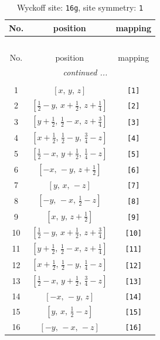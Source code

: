 \documentclass[fleqn,8pt]{jsarticle}
\begin{document}
\begin{longtable}{ccc}
\caption{Wyckoff site: {\tt 16g}, site symmetry: {\tt 1}}
 \\
 \hline \hline
No. & position & mapping \\ \hline \endfirsthead

\multicolumn{2}{l}{\tablename\ \thetable{}} \\
 \hline \hline
No. & position & mapping \\ \hline \endhead

 \hline \hline
\multicolumn{2}{r}{\footnotesize\it continued ...} \\ \endfoot

 \hline \hline
\multicolumn{2}{r}{} \\ \endlastfoot

1 & $\left[ x,\, y,\, z \right]$ & {\tt [1]} \\ \hline
2 & $\left[ \frac{1}{2} - y,\, x + \frac{1}{2},\, z + \frac{1}{4} \right]$ & {\tt [2]} \\ \hline
3 & $\left[ y + \frac{1}{2},\, \frac{1}{2} - x,\, z + \frac{3}{4} \right]$ & {\tt [3]} \\ \hline
4 & $\left[ x + \frac{1}{2},\, \frac{1}{2} - y,\, \frac{3}{4} - z \right]$ & {\tt [4]} \\ \hline
5 & $\left[ \frac{1}{2} - x,\, y + \frac{1}{2},\, \frac{1}{4} - z \right]$ & {\tt [5]} \\ \hline
6 & $\left[ - x,\, - y,\, z + \frac{1}{2} \right]$ & {\tt [6]} \\ \hline
7 & $\left[ y,\, x,\, - z \right]$ & {\tt [7]} \\ \hline
8 & $\left[ - y,\, - x,\, \frac{1}{2} - z \right]$ & {\tt [8]} \\ \hline
9 & $\left[ x,\, y,\, z + \frac{1}{2} \right]$ & {\tt [9]} \\ \hline
10 & $\left[ \frac{1}{2} - y,\, x + \frac{1}{2},\, z + \frac{3}{4} \right]$ & {\tt [10]} \\ \hline
11 & $\left[ y + \frac{1}{2},\, \frac{1}{2} - x,\, z + \frac{1}{4} \right]$ & {\tt [11]} \\ \hline
12 & $\left[ x + \frac{1}{2},\, \frac{1}{2} - y,\, \frac{1}{4} - z \right]$ & {\tt [12]} \\ \hline
13 & $\left[ \frac{1}{2} - x,\, y + \frac{1}{2},\, \frac{3}{4} - z \right]$ & {\tt [13]} \\ \hline
14 & $\left[ - x,\, - y,\, z \right]$ & {\tt [14]} \\ \hline
15 & $\left[ y,\, x,\, \frac{1}{2} - z \right]$ & {\tt [15]} \\ \hline
16 & $\left[ - y,\, - x,\, - z \right]$ & {\tt [16]} \\
\end{longtable}
\end{document}
